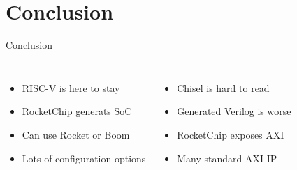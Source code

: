 \documentclass[]{beamer} %
\begin{document}


\section[Conclusion]{Conclusion}


\begin{frame}{Conclusion}
		\begin{columns}
			\begin{itemize}
				\item RISC-V is here to stay
				\item RocketChip generats SoC
				\item Can use Rocket or Boom
				\item Lots of configuration options
			\end{itemize}
			\begin{itemize}
				\item Chisel is hard to read
				\item Generated Verilog is worse
				\item RocketChip exposes AXI
				\item Many standard AXI IP
			\end{itemize}
		\end{columns}
\end{frame}



\end{document}
